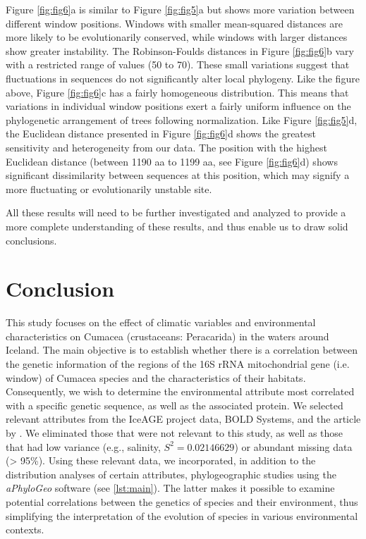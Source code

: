Figure \ref{fig:fig6}a is similar to Figure \ref{fig:fig5}a but shows more variation between different window positions. Windows with smaller mean-squared distances are more likely to be evolutionarily conserved, while windows with larger distances show greater instability. The Robinson-Foulds distances in Figure \ref{fig:fig6}b vary with a restricted range of values (50 to 70). These small variations suggest that fluctuations in sequences do not significantly alter local phylogeny. Like the figure above, Figure \ref{fig:fig6}c has a fairly homogeneous distribution. This means that variations in individual window positions exert a fairly uniform influence on the phylogenetic arrangement of trees following normalization. Like Figure \ref{fig:fig5}d, the Euclidean distance presented in Figure \ref{fig:fig6}d shows the greatest sensitivity and heterogeneity from our data. The position with the highest Euclidean distance (between 1190 aa to 1199 aa, see Figure \ref{fig:fig6}d) shows significant dissimilarity between sequences at this position, which may signify a more fluctuating or evolutionarily unstable site. 

All these results will need to be further investigated and analyzed to provide a more complete understanding of these results, and thus enable us to draw solid conclusions.

\section{Conclusion}\label{conclusion}

This study focuses on the effect of climatic variables and environmental characteristics on Cumacea (crustaceans: Peracarida) in the waters around Iceland. The main objective is to establish whether there is a correlation between the genetic information of the regions of the 16S rRNA mitochondrial gene (i.e. window) of Cumacea species and the characteristics of their habitats. Consequently, we wish to determine the environmental attribute most correlated with a specific genetic sequence, as well as the associated protein. We selected relevant attributes from the IceAGE project data, BOLD Systems, and the article by \citep{uhlir_adding_2021}. We eliminated those that were not relevant to this study, as well as those that had low variance (e.g., salinity, $S^2 = 0.02146629$) or abundant missing data (> 95\%). Using these relevant data, we incorporated, in addition to the distribution analyses of certain attributes, phylogeographic studies using the \textit{aPhyloGeo} software (see \autoref{lst:main}). The latter makes it possible to examine potential correlations between the genetics of species and their environment, thus simplifying the interpretation of the evolution of species in various environmental contexts.

